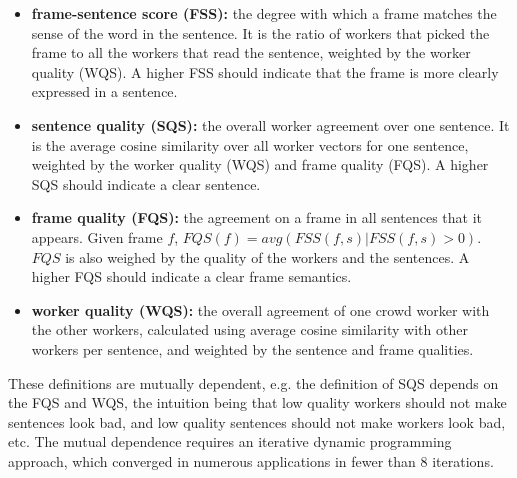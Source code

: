 \begin{itemize}
\item \textbf{frame-sentence score (FSS):} the degree with which a frame matches the sense of the word in the sentence. It is the ratio of workers that picked the frame to all the workers that read the sentence, weighted by the worker quality (WQS).  A higher FSS should indicate that the frame is more clearly expressed in a sentence.

\item \textbf{sentence quality (SQS):} the overall worker agreement over one sentence. It is the average cosine similarity over all worker vectors for one sentence, weighted by the worker quality (WQS) and frame quality (FQS). A higher SQS should indicate a clear sentence.

\item \textbf{frame quality (FQS):} the agreement on a frame in all sentences that it appears. Given frame $f$, $ FQS(f) = avg(FSS(f,s) | FSS(f,s) > 0)$. $FQS$ is also weighed by the quality of the workers and the sentences.  A higher FQS should indicate a clear frame semantics.

\item \textbf{worker quality (WQS):} the overall agreement of one crowd worker with the other workers, calculated using average cosine similarity with other workers per sentence, and weighted by the sentence and frame qualities.

\end{itemize}

These definitions are mutually dependent, e.g. the definition of SQS depends on the FQS and WQS, the intuition being that low quality workers should not make sentences look bad, and low quality sentences should not make workers look bad, etc.  The mutual dependence requires an iterative  dynamic programming approach, which converged in numerous applications in fewer than 8 iterations.

